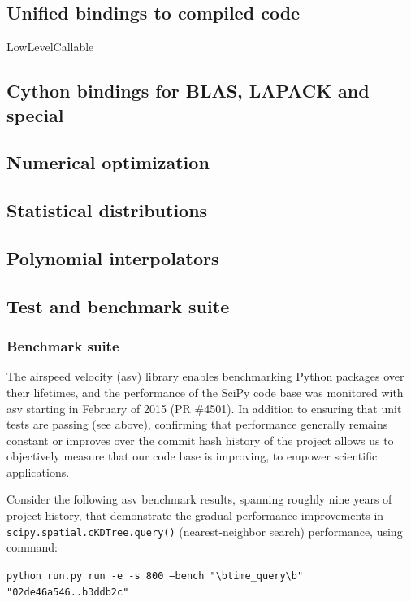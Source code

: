\documentclass[fleqn,10pt]{wlscirep}
\begin{document}
\subsection*{Unified bindings to compiled code}
LowLevelCallable

\subsection*{Cython bindings for BLAS, LAPACK and special}

\subsection*{Numerical optimization}



\subsection*{Statistical distributions}

\subsection*{Polynomial interpolators}

\subsection*{Test and benchmark suite}

    \subsubsection*{Benchmark suite}
    The airspeed velocity (asv) library enables benchmarking Python packages over their lifetimes, and the performance of the SciPy
    code base was monitored with asv starting in February of 2015 (PR \#4501). In addition to ensuring that unit tests are passing (see above),
    confirming that performance generally remains constant or improves over the commit hash history of the project allows us to objectively
    measure that our code base is improving, to empower scientific applications.

    Consider the following asv benchmark results, spanning roughly nine years of project history, that demonstrate the gradual performance
    improvements in \texttt{scipy.spatial.cKDTree.query()} (nearest-neighbor search) performance, using command:

    \texttt{python run.py run -e -s 800 --bench "\textbackslash btime\_query\textbackslash b" "02de46a546..b3ddb2c"}
\end{document}
